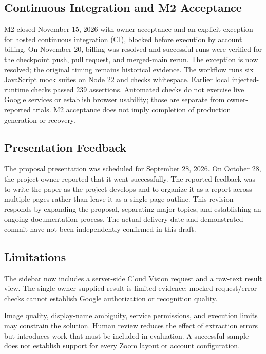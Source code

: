 \subsection{Continuous Integration and M2 Acceptance}
M2 closed November 15, 2026 with owner acceptance and an explicit exception for
hosted continuous integration (CI), blocked before execution by account billing.
On November 20, billing was resolved and successful runs were verified for the
\href{https://github.com/Michael-Kowata/ITC-492/actions/runs/43771430365}{checkpoint push},
\href{https://github.com/Michael-Kowata/ITC-492/actions/runs/43771457473}{pull request}, and
\href{https://github.com/Michael-Kowata/ITC-492/actions/runs/43773008874}{merged-main rerun}.
The exception is now resolved; the original timing remains historical evidence.
The workflow runs six JavaScript mock suites on Node 22 and checks whitespace.
Earlier local injected-runtime checks passed 239 assertions. Automated checks
do not exercise live Google services or establish browser usability; those are
separate from owner-reported trials. M2 acceptance does not imply completion
of production generation or recovery.

\subsection{Presentation Feedback}
The proposal presentation was scheduled for September 28, 2026. On October 28,
the project owner reported that it went successfully. The reported feedback was
to write the paper as the project develops and to organize it as a report across
multiple pages rather than leave it as a single-page outline. This revision
responds by expanding the proposal, separating major topics, and establishing
an ongoing documentation process. The actual delivery date and demonstrated
commit have not been independently confirmed in this draft.

\subsection{Limitations}
The sidebar now includes a server-side Cloud Vision request and a raw-text
result view. The single owner-supplied result is limited evidence; mocked
request/error checks cannot establish Google authorization or recognition quality.

Image quality, display-name ambiguity, service permissions, and execution limits
may constrain the solution. Human review reduces the effect of extraction errors
but introduces work that must be included in evaluation. A successful sample
does not establish support for every Zoom layout or account configuration.
